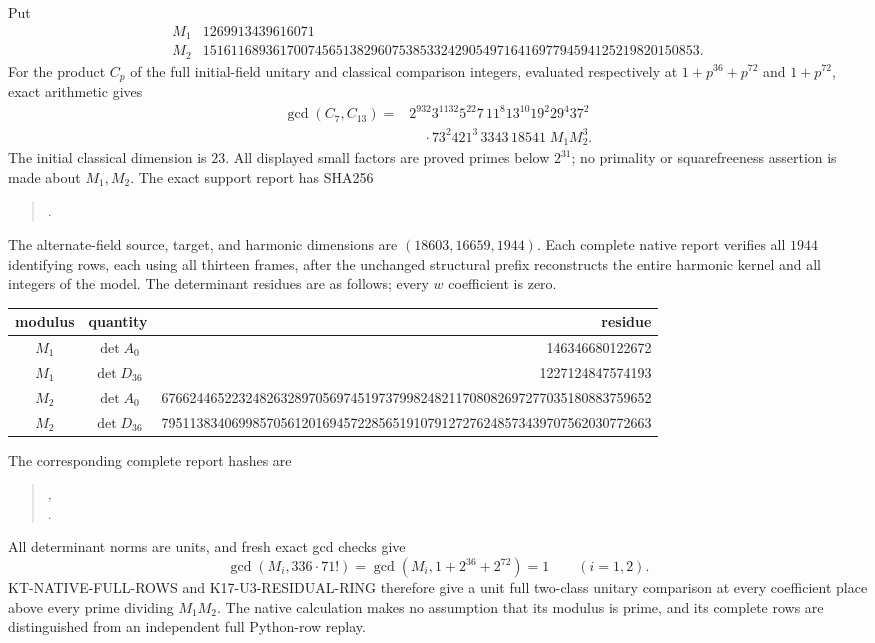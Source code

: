 \documentclass[11pt,a4paper]{article}
\theoremstyle{definition}
\begin{document}
Put
\[
\begin{array}{c|r}
 M_1&1269913439616071\\
 M_2&15161168936170074565138296075385332429054971641697794594125219820150853.
\end{array}                                                     \tag{KM.1}
\]
For the product $C_p$ of the full initial-field unitary and
classical comparison integers, evaluated respectively at
$1+p^{36}+p^{72}$ and $1+p^{72}$, exact arithmetic gives
\[
\begin{aligned}
 \gcd(C_7,C_{13})
   ={}&2^{932}3^{1132}5^{22}7\,11^8 13^{10}19^2 29^4 37^2\\
     &\quad\cdot73^2 421^3\,3343\,18541\;M_1M_2^3.
\end{aligned}                                                    \tag{KM.2}
\]
The initial classical dimension is $23$.  All displayed
small factors are proved primes below $2^{31}$; no
primality or squarefreeness assertion is made about
$M_1,M_2$.  The exact support report has SHA256
\begin{quote}\small
{}.
\end{quote}

The alternate-field source, target, and harmonic dimensions
are $(18603,16659,1944)$.  Each complete native report
verifies all $1944$ identifying rows, each using all thirteen
frames, after the unchanged structural prefix reconstructs
the entire harmonic kernel and all integers of the model.
The determinant residues are as follows; every $w$
coefficient is zero.
\begin{center}\footnotesize
\begin{tabular}{c|c|r}
modulus&quantity&residue\\\hline
$M_1$&$\det A_0$&146346680122672\\
$M_1$&$\det D_{36}$&1227124847574193\\
$M_2$&$\det A_0$&6766244652232482632897056974519737998248211708082697277035180883759652\\
$M_2$&$\det D_{36}$&7951138340699857056120169457228565191079127276248573439707562030772663
\end{tabular}
\end{center}
The corresponding complete report hashes are
\begin{quote}\small
{},\\
.
\end{quote}
All determinant norms are units, and fresh exact gcd
checks give
\[
 \gcd(M_i,336\cdot71!)=
 \gcd(M_i,1+2^{36}+2^{72})=1\qquad(i=1,2).                  \tag{KM.3}
\]
KT-NATIVE-FULL-ROWS and K17-U3-RESIDUAL-RING therefore
give a unit full two-class unitary comparison at every
coefficient place above every prime dividing $M_1M_2$.
The native calculation makes no assumption that its
modulus is prime, and its complete rows are distinguished
from an independent full Python-row replay.
\end{document}
